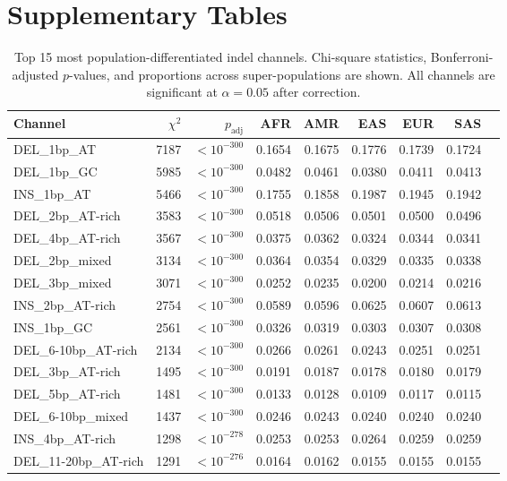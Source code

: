 \documentclass[11pt,a4paper]{article}
\begin{document}
\clearpage

\section*{Supplementary Tables}

\begin{table}[H]
\centering
\caption{Top 15 most population-differentiated indel channels. Chi-square statistics, Bonferroni-adjusted $p$-values, and proportions across super-populations are shown. All channels are significant at $\alpha = 0.05$ after correction.}
\label{tab:channels}
\small
\begin{tabular}{lrrrrrrrr}
\toprule
Channel & $\chi^2$ & $p_{\text{adj}}$ & AFR & AMR & EAS & EUR & SAS \\
\midrule
DEL\_1bp\_AT & 7187 & $<10^{-300}$ & 0.1654 & 0.1675 & 0.1776 & 0.1739 & 0.1724 \\
DEL\_1bp\_GC & 5985 & $<10^{-300}$ & 0.0482 & 0.0461 & 0.0380 & 0.0411 & 0.0413 \\
INS\_1bp\_AT & 5466 & $<10^{-300}$ & 0.1755 & 0.1858 & 0.1987 & 0.1945 & 0.1942 \\
DEL\_2bp\_AT-rich & 3583 & $<10^{-300}$ & 0.0518 & 0.0506 & 0.0501 & 0.0500 & 0.0496 \\
DEL\_4bp\_AT-rich & 3567 & $<10^{-300}$ & 0.0375 & 0.0362 & 0.0324 & 0.0344 & 0.0341 \\
DEL\_2bp\_mixed & 3134 & $<10^{-300}$ & 0.0364 & 0.0354 & 0.0329 & 0.0335 & 0.0338 \\
DEL\_3bp\_mixed & 3071 & $<10^{-300}$ & 0.0252 & 0.0235 & 0.0200 & 0.0214 & 0.0216 \\
INS\_2bp\_AT-rich & 2754 & $<10^{-300}$ & 0.0589 & 0.0596 & 0.0625 & 0.0607 & 0.0613 \\
INS\_1bp\_GC & 2561 & $<10^{-300}$ & 0.0326 & 0.0319 & 0.0303 & 0.0307 & 0.0308 \\
DEL\_6-10bp\_AT-rich & 2134 & $<10^{-300}$ & 0.0266 & 0.0261 & 0.0243 & 0.0251 & 0.0251 \\
DEL\_3bp\_AT-rich & 1495 & $<10^{-300}$ & 0.0191 & 0.0187 & 0.0178 & 0.0180 & 0.0179 \\
DEL\_5bp\_AT-rich & 1481 & $<10^{-300}$ & 0.0133 & 0.0128 & 0.0109 & 0.0117 & 0.0115 \\
DEL\_6-10bp\_mixed & 1437 & $<10^{-300}$ & 0.0246 & 0.0243 & 0.0240 & 0.0240 & 0.0240 \\
INS\_4bp\_AT-rich & 1298 & $<10^{-278}$ & 0.0253 & 0.0253 & 0.0264 & 0.0259 & 0.0259 \\
DEL\_11-20bp\_AT-rich & 1291 & $<10^{-276}$ & 0.0164 & 0.0162 & 0.0155 & 0.0155 & 0.0155 \\
\bottomrule
\end{tabular}
\end{table}
\end{document}
